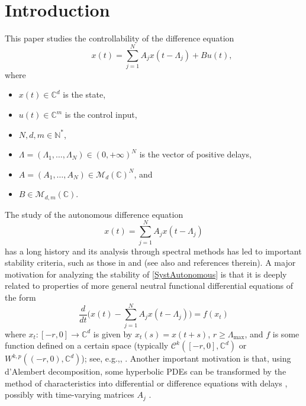 \documentclass[10pt]{article}
\newcommand{\eg}{e.g.,\xspace}
\renewcommand{\eg}{e.g.,\xspace}
\theoremstyle{plain}
\theoremstyle{definition}
\numberwithin{equation}{section}\numberwithin{figure}{section}\emergencystretch=3em
\begin{document}
\section{Introduction}
\label{SecIntro}

This paper studies the controllability of the difference equation\vspace*{-3pt}
\begin{equation}
\label{MainSyst}
\qquad x(t) = \sum_{j=1}^N A_j x(t - \Lambda_j) + B u(t),
\end{equation}
where
\begin{itemize}
\item
$x(t) \in \mathbb C^d$ is the state,
\item
$u(t) \in \mathbb C^m$ is the control input,
\item
$N, d, m \in \mathbb N^\ast$,
\item
$\Lambda = (\Lambda_1, \dots, \Lambda_N) \in (0, +\infty)^N$ is the vector of positive delays,
\item
$A = (A_1, \dots, A_N) \in \mathcal M_d(\mathbb C)^N$, and
\item
$B \in \mathcal M_{d, m}(\mathbb C)$.
\end{itemize}

The study of the autonomous difference equation\vspace*{-3pt}
\begin{equation}
\label{SystAutonomous}
x(t) = \sum_{j=1}^N A_j x(t - \Lambda_j)
\end{equation}
has a long history and its analysis through spectral methods has led to important stability criteria, such as those in \cite{Avellar1980Zeros} and \cite[Chap.\,9]{Hale1993Introduction} (see also \cite{Melvin1974Stability, Cruz1970Stability, Henry1974Linear, Datko1977Linear, Hale1985Stability, Michiels2009Strong} and references therein). A major motivation for analyzing the stability of \eqref{SystAutonomous} is that it is deeply related to properties of more general neutral functional differential equations of the form\vspace*{-3pt}
\begin{equation}
\label{NFDE}
\frac{d}{dt}\biggl(x(t) - \sum_{j=1}^N A_j x(t - \Lambda_j)\biggr) = f(x_t)
\end{equation}
where $x_t: [-r, 0] \to \mathbb C^d$ is given by $x_t(s) = x(t + s)$, $r \geq \Lambda_{\max}$, and $f$ is some function defined on a certain space (typically $\mathcal C^k([-r, 0], \mathbb C^d)$ or $W^{k, p}((-r, 0), \mathbb C^d)$); see, \eg \cite{Cruz1970Stability, Datko1977Linear, Hale1985Stability, Ngoc2015Exponential}, \cite[\S 9.7]{Hale1993Introduction}. Another important motivation is that, using d'Alembert decomposition, some hyperbolic PDEs can be transformed by the method of characteristics into differential or difference equations with delays \cite{Coron2015Dissipative, Coron2008Dissipative, Cooke1968Differential, Fridman2010Bounds, Slemrod1971Nonexistence, Kloss2012Flow}, possibly with time-varying matrices $A_j$ \cite{Chitour2017Persistently, Chitour2016Stability}.
\end{document}
